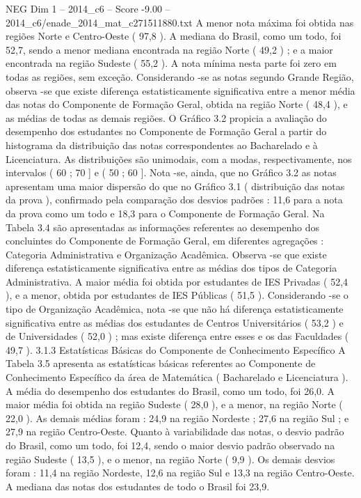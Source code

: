 \begin{textsample}{NEG Dim 1 – 2014\_c6 – Score -9.00 – 2014\_c6/enade\_2014\_mat\_c271511880.txt}
A menor nota máxima foi obtida nas regiões Norte e Centro-Oeste ( 97,8 ).
A mediana do Brasil, como um todo, foi 52,7, sendo a menor mediana encontrada na região Norte ( 49,2 ) ; e a maior encontrada na região Sudeste ( 55,2 ).
A nota mínima nesta parte foi zero em todas as regiões, sem exceção.
Considerando -se as notas segundo Grande Região, observa -se que existe diferença estatisticamente significativa entre a menor média das notas do Componente de Formação Geral, obtida na região Norte ( 48,4 ), e as médias de todas as demais regiões.
O Gráfico 3.2 propicia a avaliação do desempenho dos estudantes no Componente de Formação Geral a partir do histograma da distribuição das notas correspondentes ao Bacharelado e à Licenciatura.
As distribuições são unimodais, com a modas, respectivamente, nos intervalos ( 60 ; 70 ] e ( 50 ; 60 ].
Nota -se, ainda, que no Gráfico 3.2 as notas apresentam uma maior dispersão do que no Gráfico 3.1 ( distribuição das notas da prova ), confirmado pela comparação dos desvios padrões : 11,6 para a nota da prova como um todo e 18,3 para o Componente de Formação Geral.
Na Tabela 3.4 são apresentadas as informações referentes ao desempenho dos concluintes do Componente de Formação Geral, em diferentes agregações : Categoria Administrativa e Organização Acadêmica.
Observa -se que existe diferença estatisticamente significativa entre as médias dos tipos de Categoria Administrativa.
A maior média foi obtida por estudantes de IES Privadas ( 52,4 ), e a menor, obtida por estudantes de IES Públicas ( 51,5 ).
Considerando -se o tipo de Organização Acadêmica, nota -se que não há diferença estatisticamente significativa entre as médias dos estudantes de Centros Universitários ( 53,2 ) e de Universidades ( 52,0 ) ; mas existe diferença entre esses e os das Faculdades ( 49,7 ). 3.1.3 Estatísticas Básicas do Componente de Conhecimento Específico A Tabela 3.5 apresenta as estatísticas básicas referentes ao Componente de Conhecimento Específico da área de Matemática ( Bacharelado e Licenciatura ).
A média do desempenho dos estudantes do Brasil, como um todo, foi 26,0.
A maior média foi obtida na região Sudeste ( 28,0 ), e a menor, na região Norte ( 22,0 ).
As demais médias foram : 24,9 na região Nordeste ; 27,6 na região Sul ; e 27,9 na região Centro-Oeste.
Quanto à variabilidade das notas, o desvio padrão do Brasil, como um todo, foi 12,4, sendo o maior desvio padrão observado na região Sudeste ( 13,5 ), e o menor, na região Norte ( 9,9 ).
Os demais desvios foram : 11,4 na região Nordeste, 12,6 na região Sul e 13,3 na região Centro-Oeste.
A mediana das notas dos estudantes de todo o Brasil foi 23,9.

\end{textsample}
